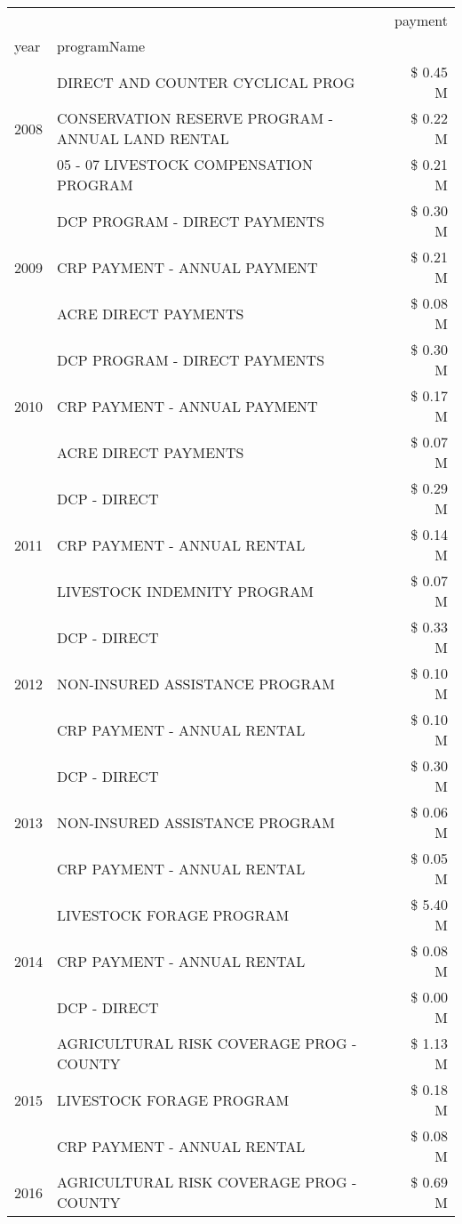 \begin{tabular}{llr}
\toprule
 &  & payment \\
year & programName &  \\
\midrule
\multirow[t]{3}{*}{2008} & DIRECT AND COUNTER CYCLICAL PROG & \$ 0.45 M \\
 & CONSERVATION RESERVE PROGRAM - ANNUAL LAND RENTAL & \$ 0.22 M \\
 & 05 - 07 LIVESTOCK COMPENSATION PROGRAM & \$ 0.21 M \\
\cline{1-3}
\multirow[t]{3}{*}{2009} & DCP PROGRAM - DIRECT PAYMENTS & \$ 0.30 M \\
 & CRP PAYMENT - ANNUAL PAYMENT & \$ 0.21 M \\
 & ACRE DIRECT PAYMENTS & \$ 0.08 M \\
\cline{1-3}
\multirow[t]{3}{*}{2010} & DCP PROGRAM - DIRECT PAYMENTS & \$ 0.30 M \\
 & CRP PAYMENT - ANNUAL PAYMENT & \$ 0.17 M \\
 & ACRE DIRECT PAYMENTS & \$ 0.07 M \\
\cline{1-3}
\multirow[t]{3}{*}{2011} & DCP - DIRECT & \$ 0.29 M \\
 & CRP PAYMENT - ANNUAL RENTAL & \$ 0.14 M \\
 & LIVESTOCK INDEMNITY PROGRAM & \$ 0.07 M \\
\cline{1-3}
\multirow[t]{3}{*}{2012} & DCP - DIRECT & \$ 0.33 M \\
 & NON-INSURED ASSISTANCE PROGRAM & \$ 0.10 M \\
 & CRP PAYMENT - ANNUAL RENTAL & \$ 0.10 M \\
\cline{1-3}
\multirow[t]{3}{*}{2013} & DCP - DIRECT & \$ 0.30 M \\
 & NON-INSURED ASSISTANCE PROGRAM & \$ 0.06 M \\
 & CRP PAYMENT - ANNUAL RENTAL & \$ 0.05 M \\
\cline{1-3}
\multirow[t]{3}{*}{2014} & LIVESTOCK FORAGE PROGRAM & \$ 5.40 M \\
 & CRP PAYMENT - ANNUAL RENTAL & \$ 0.08 M \\
 & DCP - DIRECT & \$ 0.00 M \\
\cline{1-3}
\multirow[t]{3}{*}{2015} & AGRICULTURAL RISK COVERAGE PROG - COUNTY & \$ 1.13 M \\
 & LIVESTOCK FORAGE PROGRAM & \$ 0.18 M \\
 & CRP PAYMENT - ANNUAL RENTAL & \$ 0.08 M \\
\cline{1-3}
\multirow[t]{3}{*}{2016} & AGRICULTURAL RISK COVERAGE PROG - COUNTY & \$ 0.69 M \\

\end{tabular}
